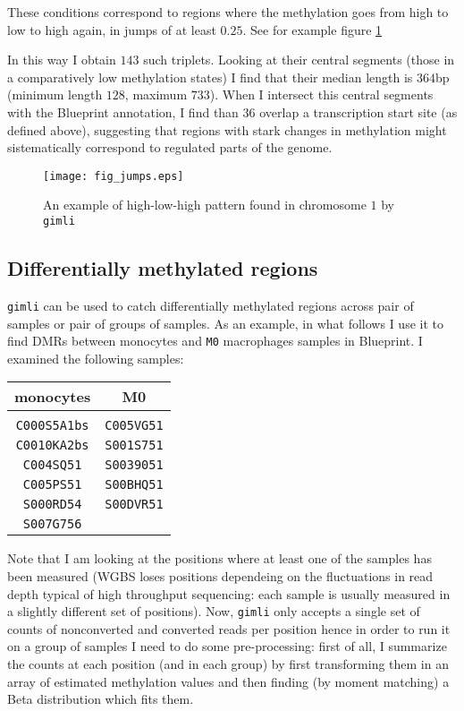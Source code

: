 \documentclass[12pt]{amsart}
\newcommand{\gimli}{\texttt{gimli}}
\begin{document}
These conditions correspond to regions where the methylation goes from 
high to low to high again,
in jumps of at least $0.25$.
See for example figure \ref{fig_jumps} 

In this way I obtain $143$ such triplets. Looking at their central segments
(those in a comparatively low methylation states) I find that their median length is
$364$bp (minimum length $128$, maximum $733$). When I intersect this central segments with the Blueprint
annotation, I find than $36$ overlap a transcription start site (as defined above), 
suggesting that regions with stark 
changes in methylation
might sistematically correspond to regulated parts of the genome.

\begin{figure}
\texttt{[image: fig\_jumps.eps]}
\caption{An example of high-low-high pattern found in chromosome $1$ by \gimli{}}
\label{fig_jumps}
\end{figure}

\subsection{Differentially methylated regions}

\gimli{} can be used to catch differentially methylated regions across pair of samples
or pair of groups of samples.
As an example, in what follows I use it to find DMRs between monocytes and \texttt{M0} macrophages 
samples in Blueprint.  I examined the following samples:

\begin{center}
\begin{tabular}{c|c}
monocytes & M0  \\
\hline \\
\texttt{C000S5A1bs} & \texttt{C005VG51} \\
\texttt{C0010KA2bs} & \texttt{S001S751} \\
\texttt{C004SQ51} & \texttt{S0039051} \\
\texttt{C005PS51} & \texttt{S00BHQ51}\\
\texttt{S000RD54} & \texttt{S00DVR51} \\
\texttt{S007G756} &  \\
\hline
\end{tabular}
\end{center}
 
Note that I am looking at the positions where at least one of the samples has been 
measured (WGBS loses positions dependeing on the fluctuations in read depth 
typical of high throughput sequencing: 
each sample is usually measured in a slightly different set of positions).
Now, \gimli{} only accepts a single set of counts of nonconverted and converted 
reads per position
hence in order to run it on a group of samples I need to do some pre-processing:  
first of all, I summarize the counts at each position (and in each group) 
by first transforming them in an array of estimated 
methylation values and then finding (by moment matching) a Beta 
distribution which fits them. 
\end{document}
